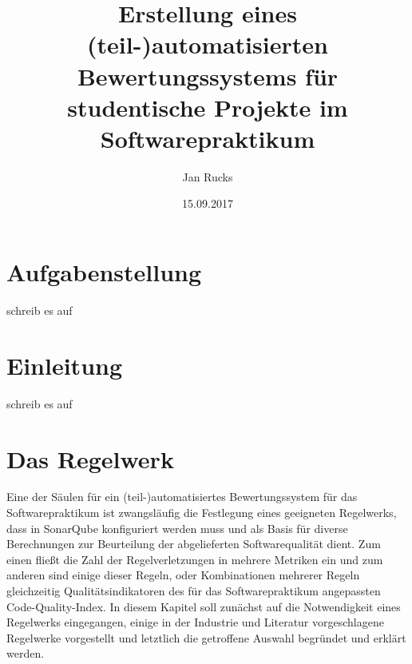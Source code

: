 \documentclass[da,ngerman]{stthesis}
\title{Erstellung eines (teil-)automatisierten \newline
Bewertungssystems für studentische \newline
Projekte im Softwarepraktikum}
\author{Jan Rucks}
\date{15.09.2017}
\begin{document}
	\maketitle 
	\chapter*{Aufgabenstellung}
		schreib es auf
		
	\tableofcontents
  
	\chapter{Einleitung}
  		schreib es auf
    
	\chapter{Das Regelwerk}
		Eine der Säulen für ein (teil-)automatisiertes Bewertungssystem für das Softwarepraktikum ist zwangsläufig die Festlegung eines geeigneten Regelwerks, dass in SonarQube konfiguriert werden muss und als Basis für diverse Berechnungen zur Beurteilung der abgelieferten Softwarequalität dient. Zum einen fließt die Zahl der Regelverletzungen in mehrere Metriken ein und zum anderen sind einige dieser Regeln, oder Kombinationen mehrerer Regeln gleichzeitig Qualitätsindikatoren des für das Softwarepraktikum angepassten Code-Quality-Index. In diesem Kapitel soll zunächst auf die Notwendigkeit eines Regelwerks eingegangen, einige in der Industrie und Literatur vorgeschlagene Regelwerke vorgestellt und letztlich die getroffene Auswahl begründet und erklärt werden.
\end{document}
